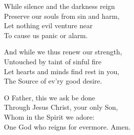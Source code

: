 
While silence and the darkness reign\\
Preserve our souls from sin and harm,\\
Let nothing evil venture near\\
To cause us panic or alarm.

And while we thus renew our strength,\\
Untouched by taint of sinful fire \\
Let hearts and minds find rest in you,\\
The Source of ev’ry good desire.

O Father, this we ask be done\\
Through Jesus Christ, your only Son,\\
Whom in the Spirit we adore:\\
One God who reigns for evermore. Amen.